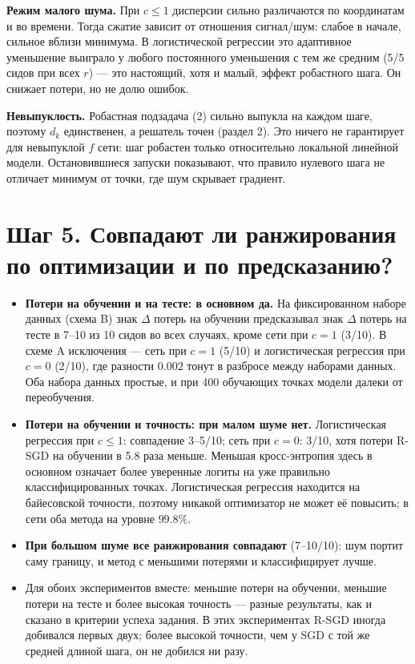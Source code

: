 \documentclass[11pt,a4paper]{article}
\begin{document}
\textbf{Режим малого шума.} При $c\le1$ дисперсии сильно различаются по координатам и во
времени. Тогда сжатие зависит от отношения сигнал/шум: слабое в начале, сильное вблизи
минимума. В логистической регрессии это адаптивное уменьшение выиграло у любого постоянного
уменьшения с тем же средним (5/5 сидов при всех $r$) — это настоящий, хотя и малый, эффект
робастного шага. Он снижает потери, но не долю ошибок.

\textbf{Невыпуклость.} Робастная подзадача (2) сильно выпукла на каждом шаге, поэтому $d_k$
единственен, а решатель точен (раздел 2). Это ничего не гарантирует для невыпуклой $f$ сети:
шаг робастен только относительно локальной линейной модели. Остановившиеся запуски показывают,
что правило нулевого шага не отличает минимум от точки, где шум скрывает градиент.

\section*{Шаг 5. Совпадают ли ранжирования по оптимизации и по предсказанию?}

\begin{itemize}
\item \textbf{Потери на обучении и на тесте: в основном да.} На фиксированном наборе данных
(схема B) знак $\Delta$ потерь на обучении предсказывал знак $\Delta$ потерь на тесте в 7--10 из
10 сидов во всех случаях, кроме сети при $c=1$ (3/10). В схеме A исключения — сеть при $c=1$
(5/10) и логистическая регрессия при $c=0$ (2/10), где разности $0.002$ тонут в разбросе между
наборами данных. Оба набора данных простые, и при 400 обучающих точках модели далеки от
переобучения.
\item \textbf{Потери на обучении и точность: при малом шуме нет.} Логистическая регрессия при
$c\le1$: совпадение 3--5/10; сеть при $c=0$: 3/10, хотя потери R-SGD на обучении в 5.8 раза
меньше. Меньшая кросс-энтропия здесь в основном означает более уверенные логиты на уже
правильно классифицированных точках. Логистическая регрессия находится на байесовской
точности, поэтому никакой оптимизатор не может её повысить; в сети оба метода на уровне $99.8\%$.
\item \textbf{При большом шуме все ранжирования совпадают} (7--10/10): шум портит саму границу, и
метод с меньшими потерями и классифицирует лучше.
\item Для обоих экспериментов вместе: меньшие потери на обучении, меньшие потери на тесте и
более высокая точность — разные результаты, как и сказано в критерии успеха задания. В этих
экспериментах R-SGD иногда добивался первых двух; более высокой точности, чем у SGD с той же
средней длиной шага, он не добился ни разу.
\end{itemize}
\end{document}

